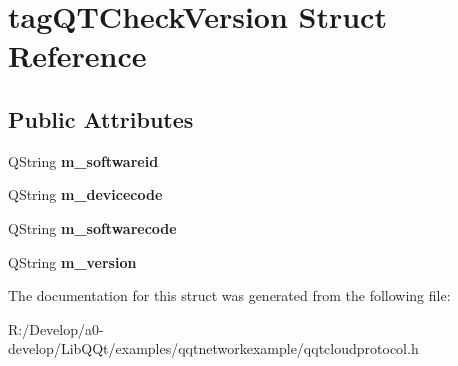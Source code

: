 \hypertarget{structtag_q_t_check_version}{}\section{tag\+Q\+T\+Check\+Version Struct Reference}
\label{structtag_q_t_check_version}
\subsection*{Public Attributes}
\begin{DoxyCompactItemize}
\item 
\mbox{\label{structtag_q_t_check_version_aa2e9eb783bb12143d4edb52bf2a05a9e}} 
Q\+String {\bfseries m\+\_\+softwareid}
\item 
\mbox{\label{structtag_q_t_check_version_abae876e9d3621324567b6ed3e506addf}} 
Q\+String {\bfseries m\+\_\+devicecode}
\item 
\mbox{\label{structtag_q_t_check_version_a013ec321ebb02e4f7c7a602101f413a7}} 
Q\+String {\bfseries m\+\_\+softwarecode}
\item 
\mbox{\label{structtag_q_t_check_version_ad95b5e10ac5a7abc36b6d8f747439c43}} 
Q\+String {\bfseries m\+\_\+version}
\end{DoxyCompactItemize}


The documentation for this struct was generated from the following file\+:\begin{DoxyCompactItemize}
\item 
R\+:/\+Develop/a0-\/develop/\+Lib\+Q\+Qt/examples/qqtnetworkexample/qqtcloudprotocol.\+h\end{DoxyCompactItemize}
